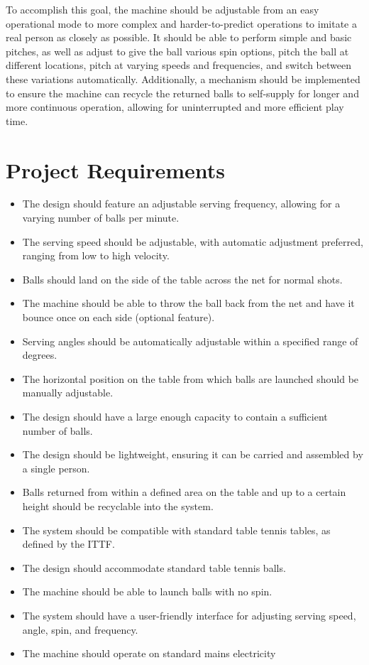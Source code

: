\documentclass[12pt]{article}
\begin{document}
To accomplish this goal, the machine should be adjustable from an easy operational mode to more complex and harder-to-predict operations to imitate a real person as closely as possible. It should be able to perform simple and basic pitches, as well as adjust to give the ball various spin options, pitch the ball at different locations, pitch at varying speeds and frequencies, and switch between these variations automatically. Additionally, a mechanism should be implemented to ensure the machine can recycle the returned balls to self-supply for longer and more continuous operation, allowing for uninterrupted and more efficient play time.
\quad 

\section{Project Requirements}
\begin{itemize}
    \item The design should feature an adjustable serving frequency, allowing for a varying number of balls per minute.
    \item The serving speed should be adjustable, with automatic adjustment preferred, ranging from low to high velocity.
    \item Balls should land on the side of the table across the net for normal shots.
    \item The machine should be able to throw the ball back from the net and have it bounce once on each side (optional feature).
    \item Serving angles should be automatically adjustable within a specified range of degrees.
    \item The horizontal position on the table from which balls are launched should be manually adjustable.
    \item The design should have a large enough capacity to contain a sufficient number of balls.
    \item The design should be lightweight, ensuring it can be carried and assembled by a single person.
    \item Balls returned from within a defined area on the table and up to a certain height should be recyclable into the system.
    \item The system should be compatible with standard table tennis tables, as defined by the ITTF.
    \item The design should accommodate standard table tennis balls.
    \item The machine should be able to launch balls with no spin.
    \item The system should have a user-friendly interface for adjusting serving speed, angle, spin, and frequency.
    \item The machine should operate on standard mains electricity
\end{itemize}
\quad 
\end{document}
